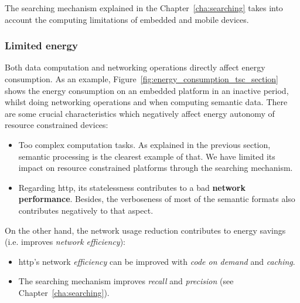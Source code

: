The searching mechanism explained in the Chapter~\ref{cha:searching} takes into account the computing limitations of embedded and mobile devices.



\subsubsection{Limited energy}

Both data computation and networking operations directly affect energy consumption.
As an example, Figure~\ref{fig:energy_consumption_tsc_section} shows the energy consumption on an embedded platform in an inactive period, whilst doing networking operations and when computing semantic data. %
There are some crucial characteristics which negatively affect energy autonomy of resource constrained devices:
\begin{itemize}
  \item Too complex computation tasks.
        As explained in the previous section, semantic processing is the clearest example of that.
        We have limited its impact on resource constrained platforms through the searching mechanism.
  \item Regarding \ac{http}, its statelessness contributes to a bad \textbf{network performance}.
        Besides, the verboseness of most of the semantic formats also contributes negatively to that aspect.
\end{itemize}




On the other hand, the network usage reduction contributes to energy savings (i.e. improves \emph{network efficiency}):
\begin{itemize}
  \item \ac{http}'s network \emph{efficiency} can be improved with \emph{code on demand} and \emph{caching}.
  \item The searching mechanism improves \emph{recall} and \emph{precision} (see Chapter~\ref{cha:searching}).
\end{itemize}





